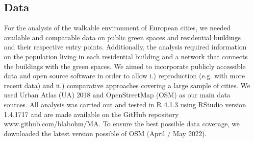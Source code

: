 \documentclass[10pt]{article}
\begin{document}
\begin{table}[h!]
\centering
{}
\caption{Overview input data sources and respective data coverage (see appendix 1 for exhaustive version}
\label{tab:data}
\end{table}


\subsection{Data}
For the analysis of the walkable environment of European cities, we needed available and comparable data on public green spaces and residential buildings and their respective entry points.
Additionally, the analysis required information on the population living in each residential building and a network that connects the buildings with the green spaces.
We aimed to incorporate publicly accessible data and open source software in order to allow i.) reproduction (e.g. with more recent data) and ii.) comparative approaches covering a large sample of cities.
We used Urban Atlas (UA) 2018 and OpenStreetMap (OSM) as our main data sources.
All analysis was carried out and tested in R 4.1.3 using RStudio version 1.4.1717 and are made available on the GitHub repository www.github.com/blabohm/MA.
To ensure the best possible data coverage, we downloaded the latest version possible of OSM (April / May 2022).
\end{document}
